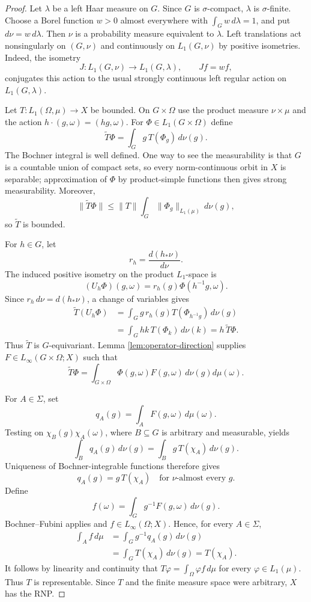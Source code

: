 \documentclass[11pt]{article}
\theoremstyle{remark}
\begin{document}
\begin{proof}
Let $\lambda$ be a left Haar measure on $G$.  Since $G$ is
$\sigma$-compact, $\lambda$ is $\sigma$-finite.  Choose a Borel function
$w>0$ almost everywhere with $\int_Gw\,d\lambda=1$, and put
$d\nu=w\,d\lambda$.  Then $\nu$ is a probability measure equivalent to
$\lambda$.  Left translations act nonsingularly on $(G,\nu)$ and
continuously on $L_1(G,\nu)$ by positive isometries.  Indeed, the isometry
\[
 J:L_1(G,\nu)\longrightarrow L_1(G,\lambda),\qquad Jf=wf,
\]
conjugates this action to the usual strongly continuous left regular
action on $L_1(G,\lambda)$.

Let $T:L_1(\Omega,\mu)\to X$ be bounded.  On $G\times\Omega$ use the
product measure $\nu\times\mu$ and the action
$h\cdot(g,\omega)=(hg,\omega)$.  For
$\Phi\in L_1(G\times\Omega)$ define
\begin{equation}
  \widetilde T\Phi
  =\int_G g\,T(\Phi_g)\,d\nu(g).
  \tag{3.1}
\end{equation}
The Bochner integral is well defined.  One way to see the measurability is
that $G$ is a countable union of compact sets, so every norm-continuous orbit
in $X$ is separable; approximation of $\Phi$ by product-simple functions
then gives strong measurability.  Moreover,
\[
 \|\widetilde T\Phi\|
 \leq \|T\|\int_G\|\Phi_g\|_{L_1(\mu)}\,d\nu(g),
\]
so $\widetilde T$ is bounded.

For $h\in G$, let
\[
 r_h=\frac{d(h_*\nu)}{d\nu}.
\]
The induced positive isometry on the product $L_1$-space is
\[
 (U_h\Phi)(g,\omega)=r_h(g)\Phi(h^{-1}g,\omega).
\]
Since $r_h\,d\nu=d(h_*\nu)$, a change of variables gives
\begin{align*}
 \widetilde T(U_h\Phi)
 &=\int_G g\,r_h(g)T(\Phi_{h^{-1}g})\,d\nu(g)\\
 &=\int_G hk\,T(\Phi_k)\,d\nu(k)
 =h\,\widetilde T\Phi.
\end{align*}
Thus $\widetilde T$ is $G$-equivariant.  Lemma
\ref{lem:operator-direction} supplies
$F\in L_\infty(G\times\Omega;X)$ such that
\[
 \widetilde T\Phi
 =\int_{G\times\Omega}\Phi(g,\omega)F(g,\omega)
 \,d\nu(g)d\mu(\omega).
\]

For $A\in\Sigma$, set
\[
 q_A(g)=\int_A F(g,\omega)\,d\mu(\omega).
\]
Testing on $\chi_B(g)\chi_A(\omega)$, where $B\subseteq G$ is arbitrary and
measurable, yields
\[
 \int_Bq_A(g)\,d\nu(g)
 =\int_Bg\,T(\chi_A)\,d\nu(g).
\]
Uniqueness of Bochner-integrable functions therefore gives
\[
 q_A(g)=g\,T(\chi_A)
 \quad\text{for $\nu$-almost every }g.
\]
Define
\[
 f(\omega)=\int_Gg^{-1}F(g,\omega)\,d\nu(g).
\]
Bochner--Fubini applies and $f\in L_\infty(\Omega;X)$.  Hence, for every
$A\in\Sigma$,
\begin{align*}
 \int_Af\,d\mu
 &=\int_Gg^{-1}q_A(g)\,d\nu(g)\\
 &=\int_GT(\chi_A)\,d\nu(g)
 =T(\chi_A).
\end{align*}
It follows by linearity and continuity that
$T\varphi=\int_\Omega\varphi f\,d\mu$ for every
$\varphi\in L_1(\mu)$.  Thus $T$ is representable.  Since $T$ and the finite
measure space were arbitrary, $X$ has the RNP.
\end{proof}
\end{document}

